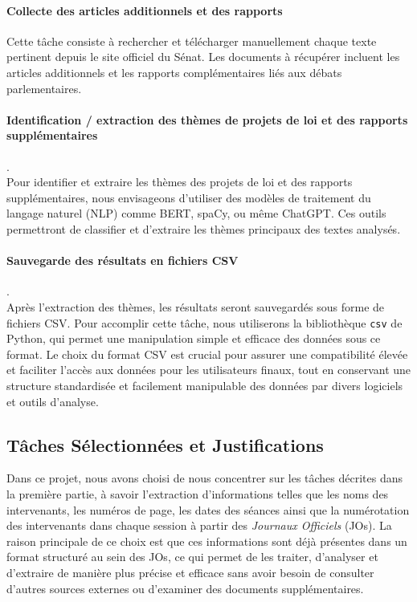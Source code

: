 \paragraph{Collecte des articles additionnels et des rapports}  
Cette tâche consiste à rechercher et télécharger manuellement chaque texte pertinent depuis le site officiel du Sénat. Les documents à récupérer incluent les articles additionnels et les rapports complémentaires liés aux débats parlementaires.

\paragraph{Identification / extraction des thèmes de projets de loi et des rapports supplémentaires} .\\
Pour identifier et extraire les thèmes des projets de loi et des rapports supplémentaires, nous envisageons d'utiliser des modèles de traitement du langage naturel (NLP) comme \gls{BERT}, \gls{spaCy}, ou même \gls{ChatGPT}. Ces outils permettront de classifier et d'extraire les thèmes principaux des textes analysés.

\paragraph{Sauvegarde des résultats en fichiers \gls{CSV}}.\\
Après l'extraction des thèmes, les résultats seront sauvegardés sous forme de fichiers \gls{CSV}. Pour accomplir cette tâche, nous utiliserons la \gls{bibliothèque} \texttt{csv} de Python, qui permet une manipulation simple et efficace des données sous ce format. Le choix du format \gls{CSV} est crucial pour assurer une compatibilité élevée et faciliter l'accès aux données pour les utilisateurs finaux, tout en conservant une structure standardisée et facilement manipulable des données par divers logiciels et outils d'analyse. 

\subsection{Tâches Sélectionnées et Justifications}

Dans ce projet, nous avons choisi de nous concentrer sur les tâches décrites dans la première partie, à savoir l'extraction d'informations telles que les noms des intervenants, les numéros de page, les dates des séances ainsi que la numérotation des intervenants dans chaque session à partir des \textit{Journaux Officiels} (JOs). La raison principale de ce choix est que ces informations sont déjà présentes dans un format structuré au sein des JOs, ce qui permet de les traiter, d'analyser et d'extraire de manière plus précise et efficace sans avoir besoin de consulter d'autres sources externes ou d'examiner des documents supplémentaires.

